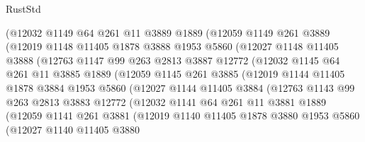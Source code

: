 \begin{lexlean}{RustStd}
\begin{coremodule}
            (@12032
              @1149
              @64
              @261
              @11
              @3889
              @1889
              (@12059
                @1149
                @261
                @3889
                (@12019
                  @1148
                  @11405
                  @1878
                  @3888
                  @1953
                  @5860
                  (@12027
                    @1148
                    @11405
                    @3888
                    (@12763
                      @1147
                      @99
                      @263
                      @2813
                      @3887
                      @12772
                      (@12032
                        @1145
                        @64
                        @261
                        @11
                        @3885
                        @1889
                        (@12059
                          @1145
                          @261
                          @3885
                          (@12019
                            @1144
                            @11405
                            @1878
                            @3884
                            @1953
                            @5860
                            (@12027
                              @1144
                              @11405
                              @3884
                              (@12763
                                @1143
                                @99
                                @263
                                @2813
                                @3883
                                @12772
                                (@12032
                                  @1141
                                  @64
                                  @261
                                  @11
                                  @3881
                                  @1889
                                  (@12059
                                    @1141
                                    @261
                                    @3881
                                    (@12019
                                      @1140
                                      @11405
                                      @1878
                                      @3880
                                      @1953
                                      @5860
                                      (@12027
                                        @1140
                                        @11405
                                        @3880

\end{coremodule}
\end{lexlean}
